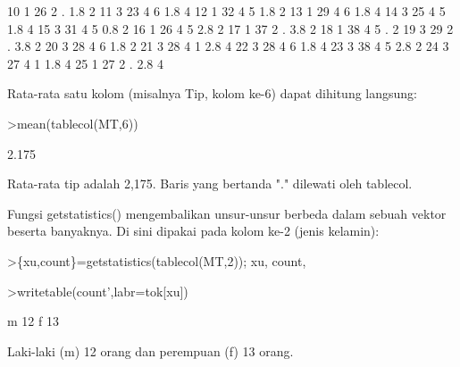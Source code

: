 \documentclass[a4paper,10pt]{article}
\begin{document}
\begin{eulernotebook}
\begin{eulercomment}
\begin{eulercomment}
\begin{eulercomment}
\begin{eulercomment}
\begin{eulercomment}
\begin{eulercomment}
\begin{eulercomment}
\begin{eulercomment}
\begin{euleroutput}
     10    1   26    2    .  1.8    2
     11    3   23    4    6  1.8    4
     12    1   32    4    5  1.8    2
     13    1   29    4    6  1.8    4
     14    3   25    4    5  1.8    4
     15    3   31    4    5  0.8    2
     16    1   26    4    5  2.8    2
     17    1   37    2    .  3.8    2
     18    1   38    4    5    .    2
     19    3   29    2    .  3.8    2
     20    3   28    4    6  1.8    2
     21    3   28    4    1  2.8    4
     22    3   28    4    6  1.8    4
     23    3   38    4    5  2.8    2
     24    3   27    4    1  1.8    4
     25    1   27    2    .  2.8    4
\end{euleroutput}
\begin{eulercomment}
Rata-rata satu kolom (misalnya Tip, kolom ke-6) dapat dihitung langsung:
\end{eulercomment}
\begin{eulerprompt}
>mean(tablecol(MT,6))
\end{eulerprompt}
\begin{euleroutput}
  2.175
\end{euleroutput}
\begin{eulercomment}
Rata-rata tip adalah 2,175. Baris yang bertanda "." dilewati oleh tablecol.

Fungsi getstatistics() mengembalikan unsur-unsur berbeda dalam sebuah vektor beserta
banyaknya. Di sini dipakai pada kolom ke-2 (jenis kelamin):
\end{eulercomment}
\begin{eulerprompt}
>\{xu,count\}=getstatistics(tablecol(MT,2)); xu, count,
\end{eulerprompt}
\begin{euleroutput}
  [1,  3]
  [12,  13]
\end{euleroutput}
\begin{eulerprompt}
>writetable(count',labr=tok[xu])
\end{eulerprompt}
\begin{euleroutput}
           m        12
           f        13
\end{euleroutput}
\begin{eulercomment}
Laki-laki (m) 12 orang dan perempuan (f) 13 orang.


\end{eulercomment}
\end{eulercomment}
\end{eulercomment}
\end{eulercomment}
\end{eulercomment}
\end{eulercomment}
\end{eulercomment}
\end{eulercomment}
\end{eulercomment}
\end{eulernotebook}
\end{document}
